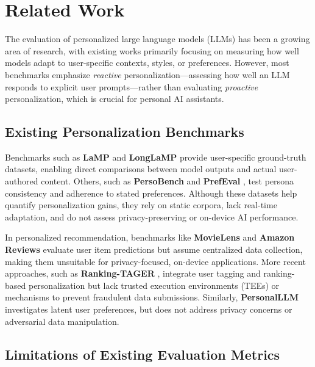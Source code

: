 \section{Related Work}
\label{sec:related_work}  

The evaluation of personalized large language models (LLMs) has been a growing area of research, with existing works primarily focusing on measuring how well models adapt to user-specific contexts, styles, or preferences. However, most benchmarks emphasize \emph{reactive} personalization—assessing how well an LLM responds to explicit user prompts—rather than evaluating \emph{proactive} personalization, which is crucial for personal AI assistants.

\subsection{Existing Personalization Benchmarks}

Benchmarks such as \textbf{LaMP} \cite{salemi2024lamplargelanguagemodels} and \textbf{LongLaMP} \cite{kumar2024longlampbenchmarkpersonalizedlongform} provide user-specific ground-truth datasets, enabling direct comparisons between model outputs and actual user-authored content. Others, such as \textbf{PersoBench} \cite{afzoon2024persobenchbenchmarkingpersonalizedresponse} and \textbf{PrefEval} \cite{anonymous2024do}, test persona consistency and adherence to stated preferences. Although these datasets help quantify personalization gains, they rely on static corpora, lack real-time adaptation, and do not assess privacy-preserving or on-device AI performance.

In personalized recommendation, benchmarks like \textbf{MovieLens} \cite{harper2015movielens} and \textbf{Amazon Reviews} \cite{ni-etal-2019-justifying} evaluate user item predictions but assume centralized data collection, making them unsuitable for privacy-focused, on-device applications. More recent approaches, such as \textbf{Ranking-TAGER} \cite{anonymous2024premium}, integrate user tagging and ranking-based personalization but lack trusted execution environments (TEEs) or mechanisms to prevent fraudulent data submissions. Similarly, \textbf{PersonalLLM} \cite{zollo2024personalllmtailoringllmsindividual} investigates latent user preferences, but does not address privacy concerns or adversarial data manipulation.

\subsection{Limitations of Existing Evaluation Metrics}

